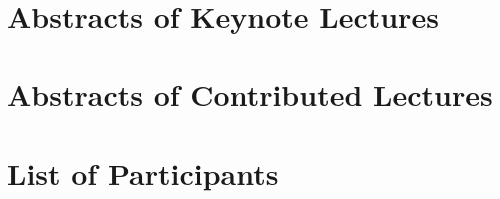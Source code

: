 \documentclass[article,A4,11pt]{llncs}%
\begin{document}
\newpage
{\ }

\tableofcontents



\part{Abstracts of Keynote Lectures}

\pagestyle{plain}

 \newpage
 \newpage
 \newpage


\part{Abstracts of Contributed Lectures}

 \newpage
 \newpage
 \newpage
 \newpage
 \newpage
 \newpage
 \newpage
 \newpage
 \newpage
 \newpage
 \newpage
 \newpage
 \newpage
 \newpage
 \newpage 
 \newpage
 \newpage
 \newpage
 \newpage
 \newpage





\newpage


\part{List of Participants}



\end{document}
